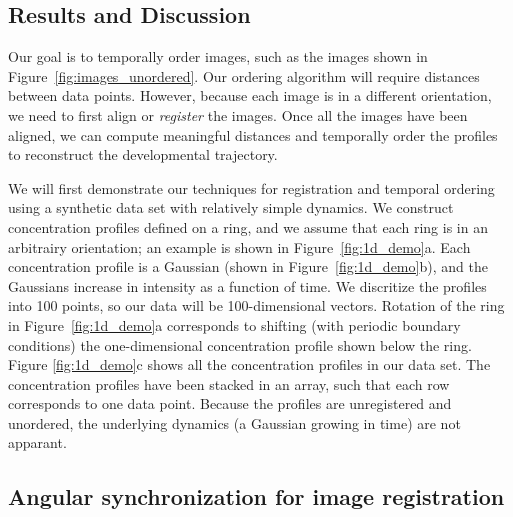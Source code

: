 \documentclass{pnastwo}
\begin{document}
\begin{article}
\section{Results and Discussion}

Our goal is to temporally order images, such as the images shown in Figure~\ref{fig:images_unordered}.
%
Our ordering algorithm will require distances between data points. 
%
However, because each image is in a different orientation, we need to first align or {\em register} the images.
%
Once all the images have been aligned, we can compute meaningful distances and temporally order the profiles to reconstruct the developmental trajectory.

We will first demonstrate our techniques for registration and temporal ordering using a synthetic data set with relatively simple dynamics.
%
We construct concentration profiles defined on a ring, and we assume that each ring is in an arbitrairy orientation; an example is shown in Figure~\ref{fig:1d_demo}a.
%
Each concentration profile is a Gaussian (shown in Figure~\ref{fig:1d_demo}b), and the Gaussians increase in intensity as  a function of time.
%
We discritize the profiles into 100 points, so our data will be 100-dimensional vectors. 
%
Rotation of the ring in Figure~\ref{fig:1d_demo}a corresponds to shifting (with periodic boundary conditions) the one-dimensional concentration profile shown below the ring. 
%
Figure \ref{fig:1d_demo}c shows all the concentration profiles in our data set. 
%
The concentration profiles have been stacked in an array, such that each row corresponds to one data point.
%
Because the profiles are unregistered and unordered, the underlying dynamics (a Gaussian growing in time) are not apparant.

\subsection{Angular synchronization for image registration}


\end{article}
\end{document}
